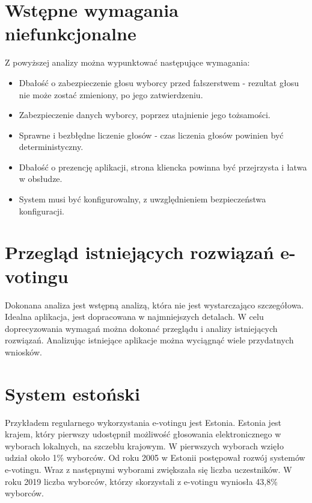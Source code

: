 \documentclass{report}
\begin{document}
\section{Wstępne wymagania niefunkcjonalne}
Z powyższej analizy można wypunktować następujące wymagania:
\begin{itemize}

\item Dbałość o zabezpieczenie głosu wyborcy przed fałszerstwem - rezultat głosu nie może zostać zmieniony, po jego zatwierdzeniu.

\item Zabezpieczenie danych wyborcy, poprzez utajnienie jego tożsamości.

\item Sprawne i bezbłędne liczenie głosów - czas liczenia głosów powinien być deterministyczny.

\item Dbałość o prezencję aplikacji, strona kliencka powinna być przejrzysta i łatwa w obsłudze.

\item System musi być konfigurowalny, z uwzględnieniem bezpieczeństwa konfiguracji.
\end{itemize}


\section{Przegląd istniejących rozwiązań e-votingu}
Dokonana analiza jest wstępną analizą, która nie jest wystarczająco szczegółowa. Idealna aplikacja, jest dopracowana w najmniejszych detalach. W celu doprecyzowania wymagań można dokonać przeglądu i analizy istniejących rozwiązań. Analizując istniejące aplikacje można wyciągnąć wiele przydatnych wniosków.
\section{System estoński}
Przykładem regularnego wykorzystania e-votingu jest Estonia. Estonia jest krajem, który pierwszy udostępnił możliwość głosowania elektronicznego w wyborach lokalnych, na szczeblu krajowym. W pierwszych wyborach wzięło udział około 1\% wyborców. Od roku 2005 w Estonii postępował rozwój systemów e-votingu. Wraz z następnymi wyborami zwiększała się liczba uczestników. W roku 2019 liczba wyborców, którzy skorzystali z e-votingu wyniosła 43,8\% wyborców.
\end{document}
